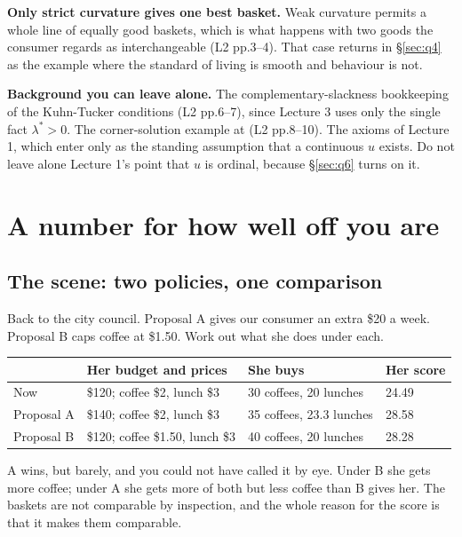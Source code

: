 \documentclass[11pt,letterpaper]{article}
\theoremstyle{definition}
\theoremstyle{plain}
\newcommand{\src}[1]{{\small\textsf{(#1)}}}
\begin{document}
\textbf{Only strict curvature gives one best basket.} Weak curvature permits a whole line of equally
good baskets, which is what happens with two goods the consumer regards as interchangeable
\src{L2 pp.3--4}. That case returns in \S\ref{sec:q4} as the example where the standard of living is
smooth and behaviour is not.

\begin{snugshade}
\noindent\textbf{Background you can leave alone.} The complementary-slackness bookkeeping of the
Kuhn-Tucker conditions \src{L2 pp.6--7}, since Lecture 3 uses only the single fact
$\lambda^* > 0$. The corner-solution example at \src{L2 pp.8--10}. The axioms of Lecture 1, which
enter only as the standing assumption that a continuous $u$ exists. Do not leave alone Lecture 1's
point that $u$ is ordinal, because \S\ref{sec:q6} turns on it.
\end{snugshade}
\section{A number for how well off you are}
\label{sec:q1}

\subsection{The scene: two policies, one comparison}

Back to the city council. Proposal A gives our consumer an extra \$20 a week. Proposal B caps coffee
at \$1.50. Work out what she does under each.

\begin{center}
\begin{tabular}{@{}llll@{}}
\toprule
 & \textbf{Her budget and prices} & \textbf{She buys} & \textbf{Her score} \\
\midrule
Now & \$120; coffee \$2, lunch \$3 & 30 coffees, 20 lunches & 24.49 \\
Proposal A & \$140; coffee \$2, lunch \$3 & 35 coffees, 23.3 lunches & 28.58 \\
Proposal B & \$120; coffee \$1.50, lunch \$3 & 40 coffees, 20 lunches & 28.28 \\
\bottomrule
\end{tabular}
\end{center}

A wins, but barely, and you could not have called it by eye. Under B she gets more coffee; under A
she gets more of both but less coffee than B gives her. The baskets are not comparable by inspection,
and the whole reason for the score is that it makes them comparable.
\end{document}
